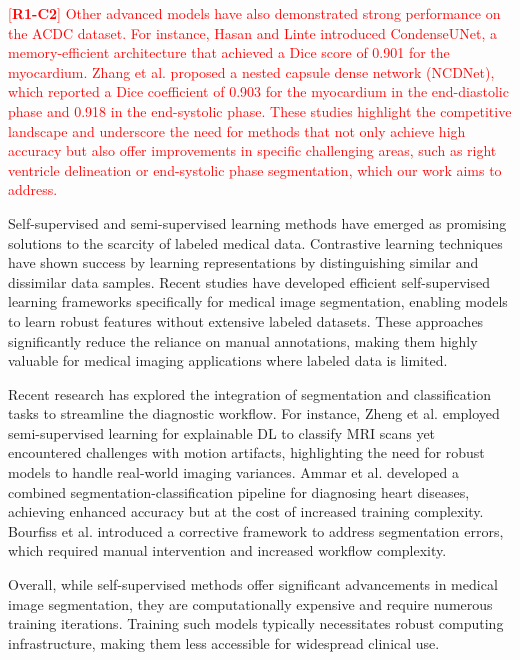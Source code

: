 \documentclass[fleqn,10pt]{wlscirep}
\newcommand{\revtag}[2]{[\textbf{R#1-C#2}]}
\newcommand{\Rone}[1]{\textcolor{red}{#1}}
\begin{document}
\Rone{\revtag{1}{2} Other advanced models have also demonstrated strong performance on the ACDC dataset. For instance, Hasan and Linte \cite{Hasan:2020} introduced CondenseUNet, a memory-efficient architecture that achieved a Dice score of 0.901 for the myocardium. Zhang et al. \cite{Zhang:2022} proposed a nested capsule dense network (NCDNet), which reported a Dice coefficient of 0.903 for the myocardium in the end-diastolic phase and 0.918 in the end-systolic phase. These studies highlight the competitive landscape and underscore the need for methods that not only achieve high accuracy but also offer improvements in specific challenging areas, such as right ventricle delineation or end-systolic phase segmentation, which our work aims to address.}

Self-supervised and semi-supervised learning methods have emerged as promising solutions to the scarcity of labeled medical data. Contrastive learning techniques \cite{Tian:2020,Chen:2020} have shown success by learning representations by distinguishing similar and dissimilar data samples. Recent studies \cite{Liu:2024,Felfeliyan:2023} have developed efficient self-supervised learning frameworks specifically for medical image segmentation, enabling models to learn robust features without extensive labeled datasets. These approaches significantly reduce the reliance on manual annotations, making them highly valuable for medical imaging applications where labeled data is limited.

Recent research has explored the integration of segmentation and classification tasks to streamline the diagnostic workflow. For instance, Zheng et al. \cite{Zheng:2019} employed semi-supervised learning for explainable DL to classify MRI scans yet encountered challenges with motion artifacts, highlighting the need for robust models to handle real-world imaging variances. Ammar et al. \cite{Ammar:2021} developed a combined segmentation-classification pipeline for diagnosing heart diseases, achieving enhanced accuracy but at the cost of increased training complexity. Bourfiss et al. \cite{Bourfiss:2023} introduced a corrective framework to address segmentation errors, which required manual intervention and increased workflow complexity.

Overall, while self-supervised methods offer significant advancements in medical image segmentation, they are computationally expensive and require numerous training iterations. Training such models typically necessitates robust computing infrastructure, making them less accessible for widespread clinical use.
\end{document}
